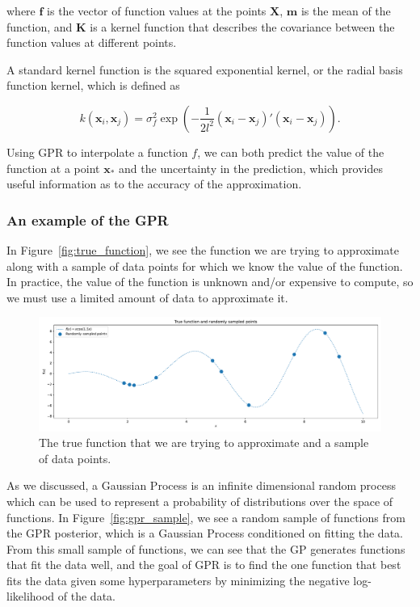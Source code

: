 \documentclass[\econtexRoot/SequentialEGM]{subfiles}
\begin{document}
where $\mathbf{f}$ is the vector of function values at the points $\mathbf{X}$, $\mathbf{m}$ is the mean of the function, and $\mathbf{K}$ is a kernel function that describes the covariance between the function values at different points.

A standard kernel function is the squared exponential kernel, or the radial basis function kernel, which is defined as

\begin{equation}
    k(\mathbf{x}_i, \mathbf{x}_j) = \sigma^2_f \exp\left(-\frac{1}{2l^2} (\mathbf{x}_i - \mathbf{x}_j)' (\mathbf{x}_i - \mathbf{x}_j)\right).
\end{equation}

Using GPR to interpolate a function $f$, we can both predict the value of the function at a point $\mathbf{x}_*$ and the uncertainty in the prediction, which provides useful information as to the accuracy of the approximation.

\subsubsection{An example of the GPR}

In Figure~\ref{fig:true_function}, we see the function we are trying to approximate along with a sample of data points for which we know the value of the function. In practice, the value of the function is unknown and/or expensive to compute, so we must use a limited amount of data to approximate it.

\begin{figure}
    \centering
    \includegraphics[width=\linewidth]{Figures/true_function.pdf}
    \caption{The true function that we are trying to approximate and a sample of data points.}
    \notinsubfile{\label{fig:true_function}}
\end{figure}

As we discussed, a Gaussian Process is an infinite dimensional random process which can be used to represent a probability of distributions over the space of functions. In Figure~\ref{fig:gpr_sample}, we see a random sample of functions from the GPR posterior, which is a Gaussian Process conditioned on fitting the data. From this small sample of functions, we can see that the GP generates functions that fit the data well, and the goal of GPR is to find the one function that best fits the data given some hyperparameters by minimizing the negative log-likelihood of the data.
\end{document}
